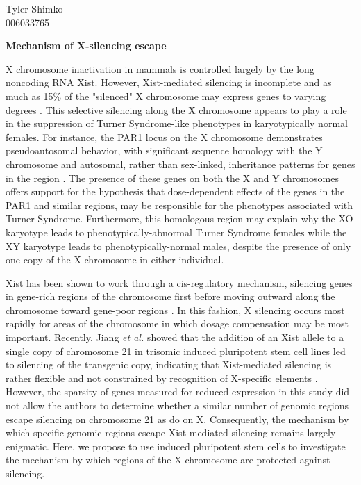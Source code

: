 \documentclass[12pt]{article}
\begin{document}
\noindent
Tyler Shimko\\
006033765

\centerline{\textbf{Mechanism of X-silencing escape}}
\vspace{12pt}

X chromosome inactivation in mammals is controlled largely by the long noncoding RNA Xist. However, Xist-mediated silencing is incomplete and as much as 15\% of the "silenced" X chromosome may express genes to varying degrees \cite{Carrel:2005id}. This selective silencing along the X chromosome appears to play a role in the suppression of Turner Syndrome-like phenotypes in karyotypically normal females. For instance, the PAR1 locus on the X chromosome demonstrates pseudoautosomal behavior, with significant sequence homology with the Y chromosome and autosomal, rather than sex-linked, inheritance patterns for genes in the region \cite{Ciccodicola:2000up}. The presence of these genes on both the X and Y chromosomes offers support for the hypothesis that dose-dependent effects of the genes in the PAR1 and similar regions, may be responsible for the phenotypes associated with Turner Syndrome. Furthermore, this homologous region may explain why the XO karyotype leads to phenotypically-abnormal Turner Syndrome females while the XY karyotype leads to phenotypically-normal males, despite the presence of only one copy of the X chromosome in either individual.

Xist has been shown to work through a cis-regulatory mechanism, silencing genes in gene-rich regions of the chromosome first before moving outward along the chromosome toward gene-poor regions \cite{Simon:2013cz}. In this fashion, X silencing occurs most rapidly for areas of the chromosome in which dosage compensation may be most important. Recently, Jiang \textit{et al.} showed that the addition of an Xist allele to a single copy of chromosome 21 in trisomic induced pluripotent stem cell lines led to silencing of the transgenic copy, indicating that Xist-mediated silencing is rather flexible and not constrained by recognition of X-specific elements \cite{Jiang:2013ii}. However, the sparsity of genes measured for reduced expression in this study did not allow the authors to determine whether a similar number of genomic regions escape silencing on chromosome 21 as do on X. Consequently, the mechanism by which specific genomic regions escape Xist-mediated silencing remains largely enigmatic. Here, we propose to use induced pluripotent stem cells to investigate the mechanism by which regions of the X chromosome are protected against silencing.
\end{document}
